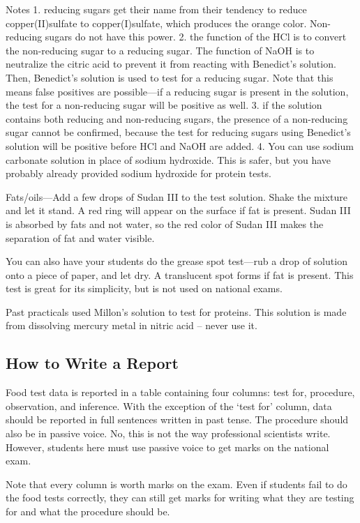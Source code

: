 \begin{enumerate}
Notes
1. reducing sugars get their name from their tendency to reduce copper(II)sulfate to copper(I)sulfate, which produces the orange color. Non-reducing sugars do not have this  power.
2. the function of the HCl is to convert the non-reducing sugar to a reducing sugar. The function of NaOH is to neutralize the citric acid to prevent it from reacting with Benedict's solution. Then, Benedict’s solution is used to test for a reducing sugar. Note that this means false positives are possible—if a reducing sugar is present in the solution, the test for a non-reducing sugar will be positive as well. 
3. if the solution contains both reducing and non-reducing sugars, the presence of a non-reducing sugar cannot be confirmed, because the test for reducing sugars using Benedict's solution will be positive before HCl and NaOH are added.
4. You can use sodium carbonate solution in place of sodium hydroxide. This is safer, but you have probably already provided sodium hydroxide for protein tests.  

Fats/oils—Add a few drops of Sudan III to the test solution. Shake the mixture and let it stand. A red ring will appear on the surface if fat is present. Sudan III is absorbed by fats and not water, so the red color of Sudan III makes the separation of fat and water visible.

You can also have your students do the grease spot test—rub a drop of solution onto a  
piece of paper, and let dry. A translucent spot forms if fat is present. This test is great for its simplicity, but is not  used on national exams.

Past practicals used Millon’s solution to test for proteins. This solution is made from dissolving mercury metal in nitric acid – never use it.

\subsection{How to Write a Report}
Food test data is reported in a table containing four columns: test for, procedure, observation, and inference. With the exception of the ‘test for’ column, data should be reported in full sentences written in past tense. The procedure should also be in passive voice. No, this is not the way professional scientists write. However, students here must use passive voice to get marks on the national exam.

Note that every column is worth marks on the exam. Even if students fail to do the food tests correctly, they can still get marks for writing what they are testing for and what the procedure should be.


\end{enumerate}
